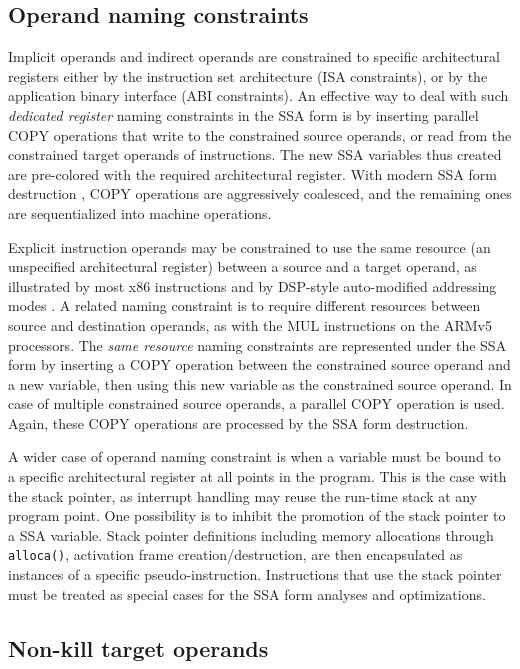 \subsection{Operand naming constraints}

Implicit operands and indirect operands are constrained to specific
architectural registers either by the instruction set architecture (ISA
constraints), or by the application binary interface (ABI constraints). An
effective way to deal with such \emph{dedicated register} naming constraints in
the SSA form is by inserting parallel COPY operations that write to the
constrained source operands, or read from the constrained target operands of
instructions.  The new SSA variables thus created are pre-colored with the
required architectural register. With modern SSA form destruction
\cite{Sreedhar:1999:SAS,Boissinot:2009:CGO}, COPY operations are aggressively
coalesced, and the remaining ones are sequentialized into machine operations.

Explicit instruction operands may be constrained to use the same resource (an
unspecified architectural register) between a source and a target operand, as
illustrated by most x86 instructions \cite{Shanley:2010:Book} and by DSP-style auto-modified addressing
modes \cite{Lee:2003:TODAES}.  A related naming constraint is to require different resources between
source and destination operands, as with the MUL instructions on the ARMv5 processors. The \emph{same
resource} naming constraints are represented under the SSA form by inserting a
COPY operation between the constrained source operand and a new variable, then
using this new variable as the constrained source operand. In case of multiple
constrained source operands, a parallel COPY operation is used.  Again, these
COPY operations are processed by the SSA form destruction.

A wider case of operand naming constraint is when a variable must be bound to a
specific architectural register at all points in the program. This is the case
with the stack pointer, as interrupt handling may reuse the run-time stack at
any program point.  One possibility is to inhibit the promotion of the stack
pointer to a SSA variable.  Stack pointer definitions including memory
allocations through \verb|alloca()|, activation frame creation/destruction, are
then encapsulated as instances of a specific pseudo-instruction. Instructions
that use the stack pointer must be treated as special cases for the SSA form
analyses and optimizations.

\subsection{Non-kill target operands} \label{sec:non-kill-target}

